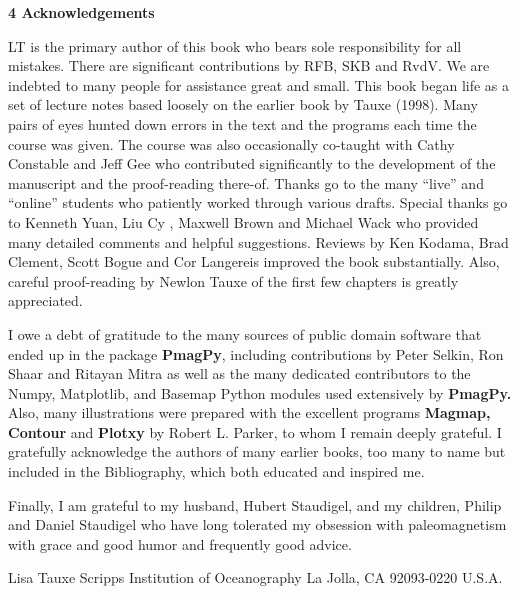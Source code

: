 \noindent
{\bf 4 Acknowledgements}
  
LT is the primary author of this book who bears sole responsibility for all mistakes.  There are significant contributions by RFB, SKB and RvdV.     We are indebted to many people for assistance
great and small.  This book began life as a set of lecture notes based loosely on the earlier book by Tauxe (1998).  Many pairs of
eyes hunted down errors  in the text
and  the programs each time the course was given.  The course was also occasionally co-taught with Cathy Constable and Jeff Gee who contributed significantly to  the development of the manuscript and the proof-reading there-of.   Thanks go to the many ``live'' and ``online'' students who patiently worked through various drafts.  Special thanks go to Kenneth Yuan,  Liu Cy , Maxwell Brown and Michael Wack who provided many detailed comments and helpful suggestions.   Reviews by Ken Kodama, Brad Clement, Scott Bogue and Cor Langereis improved the book substantially.   Also, careful proof-reading by Newlon Tauxe of the first few chapters is greatly appreciated.


I owe a debt of gratitude to the many sources of public domain software that
ended up in the package {\bf PmagPy}, including contributions by  Peter Selkin,  Ron Shaar and Ritayan Mitra as well as the many dedicated contributors to the Numpy, Matplotlib, and Basemap Python modules used extensively by {\bf PmagPy.}  Also, many illustrations were prepared with the excellent programs {\bf Magmap, Contour} and {\bf Plotxy} by Robert L. Parker, to whom I remain deeply grateful.  
I  gratefully acknowledge   the authors of many earlier  books, too many to name but included in the Bibliography,  which both educated and inspired me.


Finally, I am   grateful to my husband, Hubert Staudigel,  and my children, Philip and Daniel Staudigel who have long tolerated my obsession with paleomagnetism with grace and good humor and frequently good advice. 



\vskip 18pt
{\obeylines
Lisa Tauxe
Scripps Institution of Oceanography
La Jolla, CA 92093-0220
U.S.A.
}


